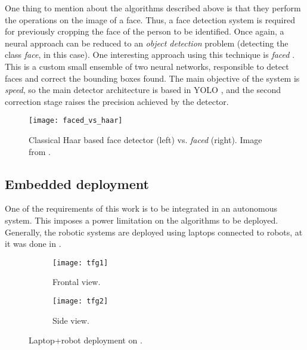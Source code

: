 One thing to mention about the algorithms described above is that they perform the operations on the image of a face. Thus, a face detection system is required for previously cropping the face of the person to be identified. Once again, a neural approach can be reduced to an \textit{object detection} problem (detecting the class \textit{face}, in this case). One interesting approach using this technique is \textit{faced} \cite{faced}. This is a custom small ensemble of two neural networks, responsible to detect faces and correct the bounding boxes found. The main objective of the system is \textit{speed}, so the main detector architecture is based in YOLO \cite{yolov1}, and the second correction stage raises the precision achieved by the detector.

\begin{figure}[h]
	\centering
	\texttt{[image: faced\_vs\_haar]}
	\caption{Classical Haar based face detector \cite{violajones} (left) vs. \textit{faced} (right). Image from \cite{faced}.}
	\label{fig:1_faced_vs_haar}
\end{figure}



\subsection{Embedded deployment}
One of the requirements of this work is to be integrated in an autonomous system. This imposes a power limitation on the algorithms to be deployed. Generally, the robotic systems are deployed using laptops connected to robots, at it was done in \cite{tfg}.

\begin{figure}[h]
	\centering
	\begin{subfigure}[h]{0.4\linewidth}
		\texttt{[image: tfg1]}
		\caption{Frontal view.}
		\label{fig:3_turtlebot_front}
	\end{subfigure}
	\begin{subfigure}[h]{0.4\linewidth}
		\texttt{[image: tfg2]}
		\caption{Side view.}
		\label{fig:3_turtlebot_side}
	\end{subfigure}
	\caption{Laptop+robot deployment on \cite{tfg}.}
	\label{fig:1_real_tfg}
\end{figure}

